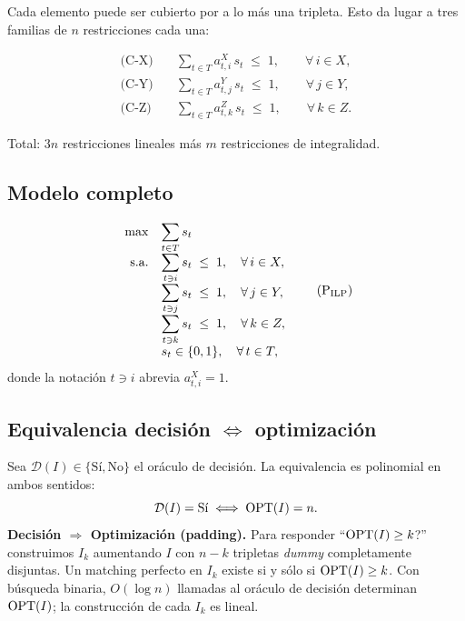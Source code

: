 Cada elemento puede ser cubierto por a lo más una tripleta.  Esto da lugar a
tres familias de $n$ restricciones cada una:

\begin{align}
\text{(C-X)} &\quad \sum_{t\in T} a^{X}_{t,i}\,s_t \;\le\; 1, \qquad \forall\,i\in X, \label{eq:cx}\\
\text{(C-Y)} &\quad \sum_{t\in T} a^{Y}_{t,j}\,s_t \;\le\; 1, \qquad \forall\,j\in Y, \label{eq:cy}\\
\text{(C-Z)} &\quad \sum_{t\in T} a^{Z}_{t,k}\,s_t \;\le\; 1, \qquad \forall\,k\in Z. \label{eq:cz}
\end{align}

Total: $3n$ restricciones lineales más $m$ restricciones de integralidad.

\subsection{Modelo completo}
\label{sec:modelo:completo}

\begin{equation}
\label{eq:ilp}
\begin{array}{rl}
\displaystyle\max & \displaystyle\sum_{t\in T} s_t \\[1.2ex]
\text{s.a.} & \displaystyle\sum_{t\ni i} s_t \;\le\; 1, \quad \forall\,i\in X, \\[1.0ex]
            & \displaystyle\sum_{t\ni j} s_t \;\le\; 1, \quad \forall\,j\in Y, \\[1.0ex]
            & \displaystyle\sum_{t\ni k} s_t \;\le\; 1, \quad \forall\,k\in Z, \\[1.0ex]
            & s_t \in \{0,1\}, \quad \forall\,t\in T,
\end{array}
\tag{P$_\text{ILP}$}
\end{equation}
donde la notación $t\ni i$ abrevia $a^{X}_{t,i}=1$.

\subsection{Equivalencia decisión \texorpdfstring{$\Leftrightarrow$}{<->} optimización}
\label{sec:modelo:equivalencia}

Sea $\mathcal{D}(I)\in\{\text{Sí},\text{No}\}$ el oráculo de decisión.
La equivalencia es polinomial en ambos sentidos:
\[
\mathcal{D}(I) = \text{Sí}
\;\Longleftrightarrow\;
\operatorname{OPT}(I) = n.
\]
\noindent
\textbf{Decisión $\Rightarrow$ Optimización (padding).}
Para responder ``$\operatorname{OPT}(I)\ge k$?'' construimos $I_k$ aumentando $I$ con
$n-k$ tripletas \emph{dummy} completamente disjuntas.
Un matching perfecto en $I_k$ existe si y sólo si $\operatorname{OPT}(I)\ge k$.
Con búsqueda binaria, $O(\log n)$ llamadas al oráculo de decisión determinan
$\operatorname{OPT}(I)$; la construcción de cada $I_k$ es lineal.

